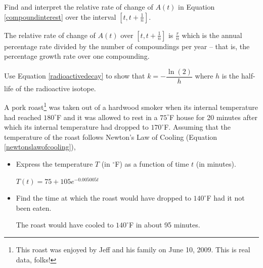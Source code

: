 \documentclass{ximera}
\begin{document}
\begin{problem}
Find and interpret the relative rate of change of  $A(t)$ in Equation \ref{compoundinterest} over the interval $\left[t, t+\frac{1}{n} \right]$.

\begin{solution}
     The relative rate of change of $A(t)$ over $\left[t, t+\frac{1}{n} \right]$ is $\frac{r}{n}$ which is the annual percentage rate divided by the number of compoundings per year -- that is,  the percentage growth rate over one compounding.
\end{solution}

\end{problem}

\begin{problem}
Use Equation \ref{radioactivedecay} to show that $k = -\dfrac{\ln(2)}{h}$ where $h$ is the half-life of the radioactive isotope.

\end{problem}

\begin{problem}
     A pork roast\footnote{This roast was enjoyed by Jeff and his family on June 10, 2009.  This is real data, folks!} was taken out of a hardwood smoker when its internal temperature had reached $180^{\circ}$F and it was allowed to rest in a $75^{\circ}$F house for 20 minutes after which its internal temperature had dropped to $170^{\circ}$F. 
Assuming that the temperature of the roast follows Newton's Law of Cooling (Equation \ref{newtonslawofcooling}),

\begin{itemize}
    \item 
    Express the temperature $T$ (in $^{\circ}$F) as a function of time $t$ (in minutes).


\begin{solution}
    $T(t) = 75 + 105e^{-0.005005t}$
\end{solution}
    
\item 
    Find the time at which the roast would have dropped to $140^{\circ}$F had it not been eaten.

\begin{solution}
    The roast would have cooled to $140^{\circ}$F in about 95 minutes.
\end{solution}
    
\end{itemize}

\end{problem}
\end{document}
